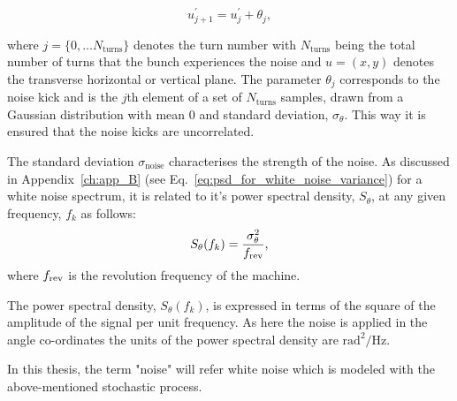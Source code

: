 \begin{equation}\label{eq:external_noise_kicks}
    u^\prime_{j+1} =  u^\prime_j + \theta_j,
\end{equation}

where $j=\{ 0,\dots N_\mathrm{turns} \}$ denotes the turn number with $N_\mathrm{turns}$ being the total number of turns that the bunch experiences the noise and $u=(x,y)$ denotes the transverse horizontal or vertical plane. The parameter $\theta_j$ corresponds to the noise kick and is the $j$th element of a set of $N_\mathrm{turns}$ samples, drawn from a Gaussian distribution with mean 0 and standard deviation, $\sigma_\theta$. This way it is ensured that the noise kicks are uncorrelated.

The standard deviation $\sigma_\mathrm{noise}$ characterises the strength of the noise. As discussed in Appendix~\ref{ch:app_B} (see Eq.~\eqref{eq:psd_for_white_noise_variance}) for a white noise spectrum, it is related to it's power spectral density, $S_\theta$, at any given frequency, $f_k$ as follows: 
\begin{equation}\label{eq:psd_for_white_noise_variance_dipole}
    S_\theta(f_k) = \frac{\sigma_\theta^2 } {{f_\mathrm{rev}}},
 \end{equation}
where ${f_\mathrm{rev}}$ is the revolution frequency of the machine.

The power spectral density, $S_\theta(f_k)$, is expressed in terms of the square of the amplitude of the signal per unit frequency. As here the noise is applied in the angle co-ordinates the units of the power spectral density are $\mathrm{rad^2/Hz}$.

In this thesis, the term "noise" will refer white noise which is modeled with the above-mentioned stochastic process.




